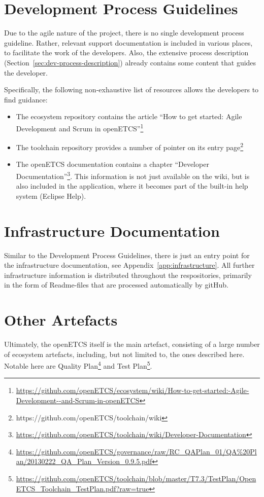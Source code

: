 \documentclass{template/openetcs_report}
\begin{document}
\section{Development Process Guidelines}
\label{dev-process-guide}

Due to the agile nature of the project, there is no single development process guideline.  Rather, relevant support documentation is included in various places, to facilitate the work of the developers.  Also, the extensive process description (Section~\ref{sec:dev-process-description}) already contains some content that guides the developer.

Specifically, the following non-exhaustive list of resources allows the developers to find guidance:

\begin{itemize}
\item The ecosystem repository contains the article ``How to get started: Agile Development and Scrum in openETCS''\footnote{\url{https://github.com/openETCS/ecosystem/wiki/How-to-get-started:-Agile-Development--and-Scrum-in-openETCS}}
\item The toolchain repository provides a number of pointer on its entry page\footnote{https://github.com/openETCS/toolchain/wiki}
\item The openETCS documentation contains a chapter ``Developer Documentation''\footnote{\url{https://github.com/openETCS/toolchain/wiki/Developer-Documentation}}.  This information is not just available on the wiki, but is also included in the application, where it becomes part of the built-in help system (Eclipse Help).
\end{itemize}

\section{Infrastructure Documentation}

Similar to the Development Process Guidelines, there is just an entry point for the infrastructure documentation, see Appendix~\ref{app:infrastructure}.  All further infrastructure information is distributed throughout the respositories, primarily in the form of Readme-files that are processed automatically by gitHub.

\section{Other Artefacts}

Ultimately, the openETCS itself is the main artefact, consisting of a large number of ecosystem artefacts, including, but not limited to, the ones described here.  Notable here are Quality Plan\footnote{\url{https://github.com/openETCS/governance/raw/RC_QAPlan_01/QA\%20Plan/20130222_QA_Plan_Version_0.9.5.pdf}} and Test Plan\footnote{\url{https://github.com/openETCS/toolchain/blob/master/T7.3/TestPlan/OpenETCS\_Toolchain\_TestPlan.pdf?raw=true}}.
\end{document}
